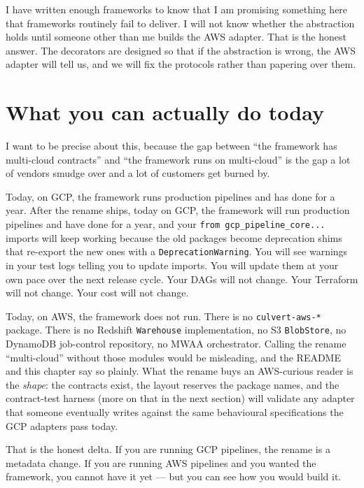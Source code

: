 \documentclass[
  11pt,
  british,
  oneside]{book}
\begin{document}
I have written enough frameworks to know that I am promising something
here that frameworks routinely fail to deliver. I will not know whether
the abstraction holds until someone other than me builds the AWS
adapter. That is the honest answer. The decorators are designed so that
if the abstraction is wrong, the AWS adapter will tell us, and we will
fix the protocols rather than papering over them.

\hypertarget{what-you-can-actually-do-today}{%
\section{What you can actually do
today}\label{what-you-can-actually-do-today}}

I want to be precise about this, because the gap between ``the framework
has multi-cloud contracts'' and ``the framework runs on multi-cloud'' is
the gap a lot of vendors smudge over and a lot of customers get burned
by.

Today, on GCP, the framework runs production pipelines and has done for
a year. After the rename ships, today on GCP, the framework will run
production pipelines and have done for a year, and your
\texttt{from\ gcp\_pipeline\_core...} imports will keep working because
the old packages become deprecation shims that re-export the new ones
with a \texttt{DeprecationWarning}. You will see
warnings in your test logs telling you to update imports. You will
update them at your own pace over the next release cycle. Your DAGs will
not change. Your Terraform will not change. Your cost will not change.

Today, on AWS, the framework does not run. There is no
\texttt{culvert-aws-*} package. There is no Redshift \texttt{Warehouse}
implementation, no S3 \texttt{BlobStore}, no DynamoDB job-control
repository, no MWAA orchestrator. Calling the rename ``multi-cloud''
without those modules would be misleading, and the README and this
chapter say so plainly. What the rename buys an AWS-curious reader is
the \emph{shape}: the contracts exist, the layout reserves the package
names, and the contract-test harness (more on that in the next section)
will validate any adapter that someone eventually writes against the
same behavioural specifications the GCP adapters pass today.

That is the honest delta. If you are running GCP pipelines, the rename
is a metadata change. If you are running AWS pipelines and you wanted
the framework, you cannot have it yet --- but you can see how you would
build it.
\end{document}
